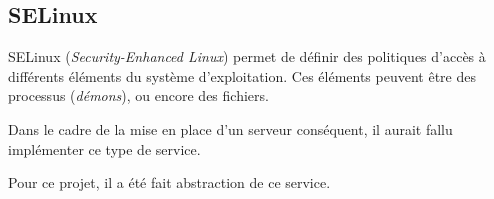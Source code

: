 \subsection{SELinux}
\label{subsec:selinux}

SELinux (\emph{Security-Enhanced Linux}) permet de définir des politiques
d'accès à différents éléments du système d'exploitation. Ces éléments peuvent
être des processus (\emph{démons}), ou encore des fichiers.

Dans le cadre de la mise en place d'un serveur conséquent, il aurait fallu
implémenter ce type de service.

Pour ce projet, il a été fait abstraction de ce service.

